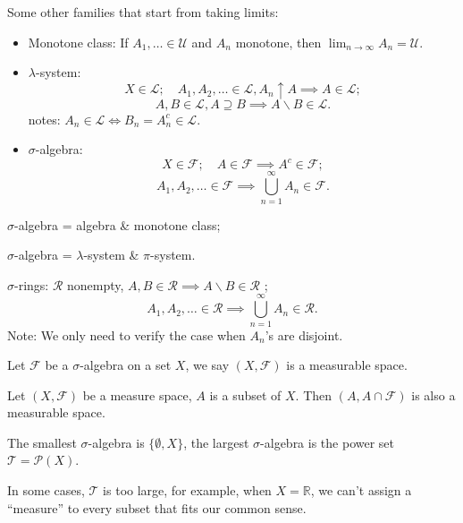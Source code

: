 \begin{definition}
	Some other families that start from taking limits:
	\begin{itemize}
		\item Monotone class: If $A_1,\dots\in \mathscr{U}$ and $A_n$
			monotone, then  $\lim_{n\to \infty}A_n =\mathscr{U}$.
		\item $\lambda$-system:
			\[
			X\in \mathscr{L};\quad
			A_1,A_2,\dots\in \mathscr{L}, A_n \uparrow A\implies A\in \mathscr{L};
			\]
			\[
			A,B\in \mathscr{L}, A \supseteq B \implies A\backslash B \in\mathscr{L}.
			\]
			notes: $A_n\in \mathscr{L}\iff B_n = A_n^c\in \mathscr{L}$.

		\item $\sigma$-algebra:
			\[
			X\in \mathscr{F};\quad A\in \mathscr{F}\implies A^c\in \mathscr{F};
			\]
			\[
			A_1,A_2,\dots\in \mathscr{F}\implies
			\bigcup_{n=1}^\infty A_n\in \mathscr{F}.
			\]
	\end{itemize}
\end{definition}
\begin{proposition}
	$\sigma$-algebra = algebra \& monotone class;

	$\sigma$-algebra =  $\lambda$-system \&  $\pi$-system.
\end{proposition}
\begin{definition}
	$\sigma$-rings:  $\mathscr{R}$ nonempty, $A,B\in \mathscr{R}\implies
	A\backslash B\in \mathscr{R}$ ;
	\[
	A_1,A_2,\dots\in \mathscr{R}\implies \bigcup_{n=1}^\infty A_n\in \mathscr{R}.
	\]
	Note: We only need to verify the case when $A_n$'s are disjoint.
\end{definition}

\begin{definition}
	Let $\mathscr{F}$ be a $\sigma$-algebra on a set $X$,
	we say $(X, \mathscr{F})$ is a measurable space.
\end{definition}

\begin{proposition}
	Let $(X,\mathscr{F})$ be a measure space, $A$ is a subset of $X$.
	Then $(A, A\cap \mathscr{F})$ is also a measurable space.
\end{proposition}

The smallest $\sigma$-algebra is  $\{\emptyset, X\}$,
the largest $\sigma$-algebra is the power set $\mathscr{T}=\mathcal{P}(X)$.

In some cases, $\mathscr{T}$ is too large, for example,
when $X=\mathbb{R}$, we can't assign a ``measure'' to every subset
that fits our common sense.
